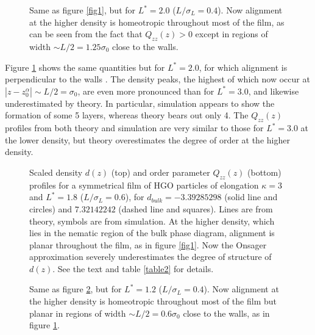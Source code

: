 \documentclass[aps,pre,twocolumn,groupedaddress,showpacs]{revtex4}
\newlength{\picW}	%
\newcommand{\picB}[1]{\fbox{\texttt{[image: \#1]}}}
\begin{document}
\picW=8cm
\begin{figure}
	\picB{bigbridfig2p.eps}
	\caption{Same as figure \protect\ref{fig1}, but for $L^*=2.0$ 
	($L/\sigma_L=0.4$). Now alignment at the higher density is homeotropic 
	throughout most of the film, as can be seen from the fact that $Q_{zz}(z)>0$ 
	except in regions of width $\sim L/2=1.25\sigma_0$ close to the walls.}
	\label{fig2}
\end{figure}


Figure \ref{fig2} shows the same quantities but for $L^*=2.0$, for which 
alignment is perpendicular to the walls \cite{Cleaver:2001,Barmes:2003}. 
The density peaks, the highest of which now occur at 
$|z-z_0^{\alpha}|\sim L/2=\sigma_0$, 
are even more pronounced than for $L^*=3.0$, and likewise 
underestimated by theory. In particular, simulation appears to show the 
formation of some 5 layers, whereas theory bears out only 4. The $Q_{zz}(z)$ 
profiles from both theory and simulation are very similar to those for 
$L^*=3.0$ at the lower density, but theory overestimates the degree of 
order at the higher density.\\

\picW=8cm
\begin{figure}
	\picB{bigbridfig3.eps}
	\caption{Scaled density $d(z)$ (top) and order parameter $Q_{zz}(z)$ (bottom)
	profiles for a symmetrical film of HGO particles of elongation $\kappa=3$ 
	and $L^*=1.8$ ($L/\sigma_L=0.6$), for $d_{bulk}=-3.39285298$ (solid line and 
	circles) and $7.32142242$ (dashed line and squares). Lines are from theory, 
	symbols are from simulation. At the higher density, which lies in the nematic 
	region of the bulk phase diagram, alignment is planar throughout the film,
	as in figure \protect\ref{fig1}. Now the Onsager approximation severely 
	underestimates the degree of structure of $d(z)$. See the text 
	and table \protect\ref{table2} for details.}
	\label{fig3}
\end{figure}

\picW=8cm
\begin{figure}
	\picB{bigbridfig4.eps}
	\caption{Same as figure \protect\ref{fig3}, but for $L^*=1.2$ 
	($L/\sigma_L=0.4$). Now alignment at the higher density is homeotropic 
	throughout most of the film but planar in regions of width 
	$\sim L/2=0.6\sigma_0$ close to the walls, as in figure \protect\ref{fig2}.}
	\label{fig4}
\end{figure}
\end{document}
